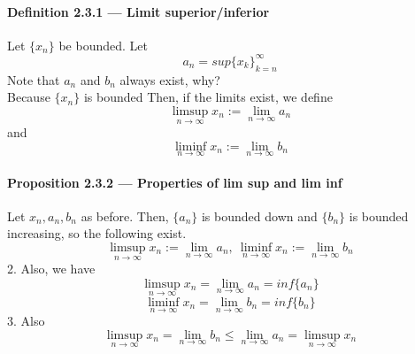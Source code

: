 \documentclass{article}
\begin{document}
\paragraph{Definition 2.3.1 — Limit superior/inferior}
Let $\{x_n\}$ be bounded. Let $$a_n=sup\{x_k\}^{\infty}_{k=n}$$
Note that $a_n$ and $b_n$ always exist, why?\\
Because $\{x_n\}$ is bounded
Then, if the limits exist, we define
$$\limsup_{n\to \infty}x_n:=\lim_{n\to \infty}a_n$$
and
$$\liminf_{n\to \infty}x_n:=\lim_{n\to \infty}b_n$$
\paragraph{Proposition 2.3.2 — Properties of lim sup and lim inf}
Let $x_n,a_n,b_n$ as before. Then, $\{a_n\}$ is bounded down and $\{b_n\}$ is bounded increasing, so the following exist.
$$\limsup_{n\to \infty}x_n:=\lim_{n\to \infty}a_n,\ \liminf_{n\to \infty}x_n:=\lim_{n\to \infty}b_n$$
2. Also, we have 
$$\limsup_{n\to \infty}x_n=\lim_{n\to \infty}{a_n}=inf\{a_n\}$$
$$\liminf_{n\to \infty}x_n=\lim_{n\to \infty}{b_n}=inf\{b_n\}$$
3. Also 
$$\limsup_{n\to \infty}x_n=\lim_{n\to \infty}b_n\leq \lim_{n\to \infty}a_n=\limsup_{n\to \infty}x_n$$
\end{document}

